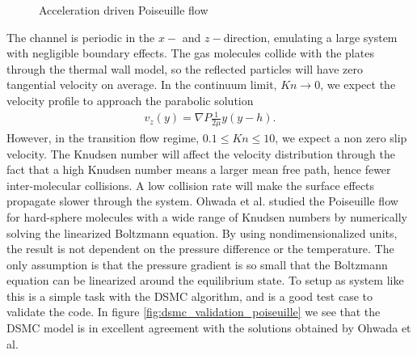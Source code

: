\begin{figure}[htp]
\centering
\label{fig:dsmc_validation_poiseuille_system}
\caption{Acceleration driven Poiseuille flow}
\end{figure}
The channel is periodic in the $x-$ and $z-$direction, emulating a large system with negligible boundary effects. The gas molecules collide with the plates through the thermal wall model, so the reflected particles will have zero tangential velocity on average. In the continuum limit, $Kn\rightarrow 0$, we expect the velocity profile to approach the parabolic solution \cite{batchelor2000introduction}
\begin{align}
	v_z(y) = \nabla P\frac{1}{2\mu}y(y-h).
\end{align}
However, in the transition flow regime, $0.1 \leq Kn \leq 10$, we expect a non zero slip velocity\cite{morris1992slip}. The Knudsen number will affect the velocity distribution through the fact that a high Knudsen number means a larger mean free path, hence fewer inter-molecular collisions. A low collision rate will make the surface effects propagate slower through the system. Ohwada et al. \cite{ohwada1989numerical} studied the Poiseuille flow for hard-sphere molecules with a wide range of Knudsen numbers by numerically solving the linearized Boltzmann equation. By using nondimensionalized units, the result is not dependent on the pressure difference or the temperature. The only assumption is that the pressure gradient is so small that the Boltzmann equation can be linearized around the equilibrium state. To setup as system like this is a simple task with the DSMC algorithm, and is a good test case to validate the code. In figure \ref{fig:dsmc_validation_poiseuille} we see that the DSMC model is in excellent agreement with the solutions obtained by Ohwada et al.
